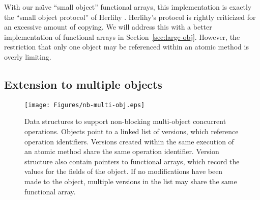 \documentclass[preprint]{rdbacmconf}
\begin{document}
With our na{\"\i}ve ``small object'' functional arrays, this implementation is
exactly the ``small object protocol'' of Herlihy \cite{Herlihy93}.
Herlihy's protocol is rightly criticized for an excessive amount of
copying.  We will address this with a better implementation of
functional arrays in Section~\ref{sec:large-obj}.
However, the restriction that only one object
may be referenced within an atomic method is overly limiting.

\subsection{Extension to multiple objects}
\begin{figure}[t]\centering
\texttt{[image: Figures/nb-multi-obj.eps]}
\caption{Data structures to support non-blocking multi-object
  concurrent operations.  Objects point to a linked list of versions,
  which reference operation identifiers.  Versions created within the
  same execution of an atomic method share the same operation
  identifier.  Version structure also contain pointers to functional
  arrays, which record the values for the fields of the object.
  If no modifications have been made to the object, multiple versions
  in the list may share the same functional array.}
\label{fig:multi-o}
\end{figure}
\end{document}
